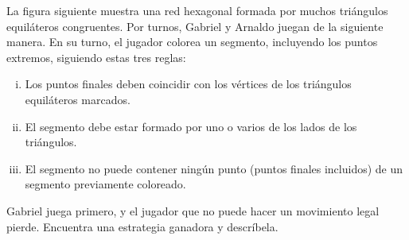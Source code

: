 La figura siguiente muestra una red hexagonal formada por muchos triángulos equiláteros congruentes. Por turnos, Gabriel y Arnaldo juegan de la siguiente manera. En su turno, el jugador colorea un segmento, incluyendo los puntos extremos, siguiendo estas tres reglas:
\begin{enumerate}[i)]
  \item Los puntos finales deben coincidir con los vértices de los triángulos equiláteros marcados.
  \item El segmento debe estar formado por uno o varios de los lados de los triángulos.
  \item El segmento no puede contener ningún punto (puntos finales incluidos) de un segmento previamente coloreado.
\end{enumerate}
Gabriel juega primero, y el jugador que no puede hacer un movimiento legal pierde. Encuentra una estrategia ganadora y descríbela.
